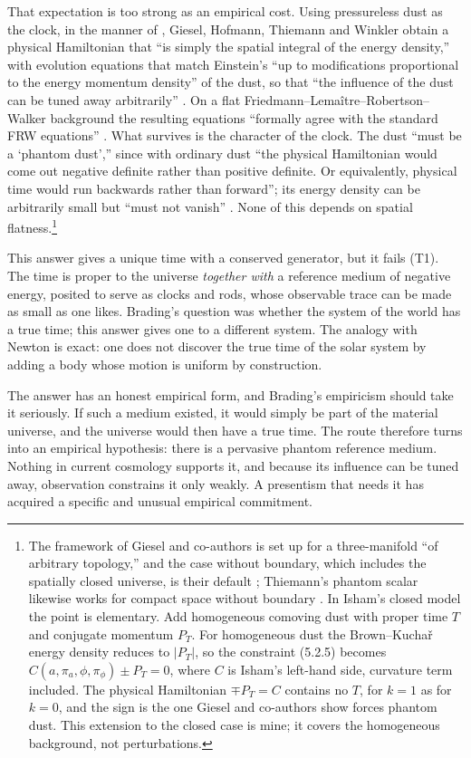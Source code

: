 \documentclass[11pt]{article}
\begin{document}
That expectation is too strong as an empirical cost. Using pressureless dust as
the clock, in the manner of \citet{BrownKuchar1995}, Giesel, Hofmann, Thiemann
and Winkler obtain a physical Hamiltonian that ``is simply the spatial integral
of the energy density,'' with evolution equations that match Einstein's ``up to
modifications proportional to the energy momentum density'' of the dust, so that
``the influence of the dust can be tuned away arbitrarily''
\citep[p.~4]{GHTW2007a}. On a flat Friedmann--Lemaître--Robertson--Walker
background the resulting equations ``formally agree with the standard FRW
equations'' \citep[p.~11]{GHTW2007b}. What survives is the character of the
clock. The dust ``must be a `phantom dust','' since with ordinary dust ``the
physical Hamiltonian would come out negative definite rather than positive
definite. Or equivalently, physical time would run backwards rather than
forward''; its energy density can be arbitrarily small but ``must not vanish''
\citep[p.~4]{GHTW2007a}. None of this depends on spatial flatness.\footnote{The
framework of Giesel and co-authors is set up for a three-manifold ``of arbitrary
topology,'' and the case without boundary, which includes the spatially closed
universe, is their default \citep[pp.~12, 36]{GHTW2007a}; Thiemann's phantom
scalar likewise works for compact space without boundary
\citep[p.~26]{Thiemann2006}. In Isham's closed model the point is elementary. Add
homogeneous comoving dust with proper time $T$ and conjugate momentum $P_T$. For
homogeneous dust the Brown--Kuchař energy density reduces to $|P_T|$, so the
constraint (5.2.5) becomes $C(a,\pi_a,\phi,\pi_\phi)\pm P_T=0$, where $C$ is
Isham's left-hand side, curvature term included. The physical Hamiltonian
$\mp P_T=C$ contains no $T$, for $k=1$ as for $k=0$, and the sign is the one
Giesel and co-authors show forces phantom dust. This extension to the closed
case is mine; it covers the homogeneous background, not perturbations.}

This answer gives a unique time with a conserved generator, but it fails (T1).
The time is proper to the universe \emph{together with} a reference medium of
negative energy, posited to serve as clocks and rods, whose observable trace can
be made as small as one likes. Brading's question was whether the system of the
world has a true time; this answer gives one to a different system. The analogy
with Newton is exact: one does not discover the true time of the solar system by
adding a body whose motion is uniform by construction.

The answer has an honest empirical form, and Brading's empiricism should take it
seriously. If such a medium existed, it would simply be part of the material
universe, and the universe would then have a true time. The route therefore
turns into an empirical hypothesis: there is a pervasive phantom reference
medium. Nothing in current cosmology supports it, and because its influence can
be tuned away, observation constrains it only weakly. A presentism that needs it
has acquired a specific and unusual empirical commitment.
\end{document}

